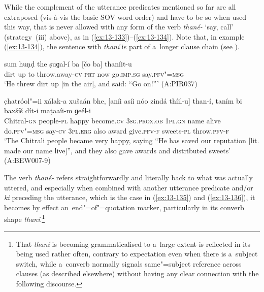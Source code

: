 While the complement of the utterance predicates mentioned so far are all extraposed (vis-à-vis the basic SOV word order) and have to be so when used this way, that is never allowed with any form of the verb \textit{thané-} `say, call' (strategy~(iii) above), as in (\ref{ex:13-133})--(\ref{ex:13-134}). Note that, in example (\ref{ex:13-134}), the sentence with \textit{thaní} is part of a~longer clause chain (see ).

\begin{exe}
\ex
\label{ex:13-133}
\gll sum huṇḍ the ṣuɡal-í ba [čo ba]  thaníit-u \\
dirt up to throw.away-\textsc{cv} \textsc{prt} now go.\textsc{imp.sg} say.\textsc{pfv"=msg} \\
\glt `He threw dirt up [in the air], and said: ``Go on!''' (A:PIR037)

\ex
\label{ex:13-134}
\gll c̣hatróol"=ii xálak-a xušaán bhe,  [aníi asíi nóo zindá thíil-u]
than-í,  taním bi baxšíš dít-i maṭaaíi-m   ɡeél-i \\
Chitral-\textsc{gn} people-\textsc{pl} happy become.\textsc{cv}  \textsc{3sg.prox.ob } \textsc{1pl.gn} name alive do.\textsc{pfv"=msg} say-\textsc{cv}  \textsc{3pl.erg} also award give.\textsc{pfv-f} sweets-\textsc{pl} throw.\textsc{pfv-f}  \\
\glt `The Chitrali people became very happy, saying ``He has saved our reputation [lit. made our name live]'', and they also gave awards and distributed sweets' (A:BEW007-9) 
\end{exe}

The verb \textit{thané-} refers straightforwardly and literally back to what was actually uttered,
and especially when combined with another utterance predicate and/or \textit{ki} preceding the
utterance, which is the case in (\ref{ex:13-135}) and (\ref{ex:13-136}), it becomes by effect
an~end"=of"=quotation marker, particularly in its converb shape \textit{thaní}.\footnote{That
  \textit{thaní} is becoming grammaticalised to a~large extent is reflected in its being used rather
  often, contrary to expectation even when there is a~subject switch, while a~converb normally
  signals same"=subject reference across clauses (as described elsewhere) without having any clear
  connection with the following discourse.}

